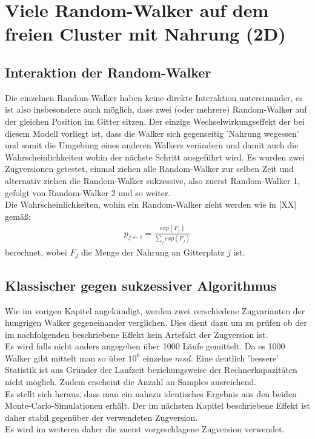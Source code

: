 \documentclass[a4paper, 12pt]{scrartcl}
\author{Sebastian Steinhäuser}
\begin{document}
\tableofcontents
\newpage
\section{Viele Random-Walker auf dem freien Cluster mit Nahrung (2D)}
\subsection{Interaktion der Random-Walker}
Die einzelnen Random-Walker haben keine direkte Interaktion untereinander, es ist also insbesondere auch möglich, dass zwei (oder mehrere) Random-Walker auf der gleichen Position im Gitter sitzen. Der einzige Wechselwirkungseffekt der bei diesem Modell vorliegt ist, dass die Walker sich gegenseitig 'Nahrung wegessen' und somit die Umgebung eines anderen Walkers verändern und damit auch die Wahrscheinlichkeiten wohin der nächste Schritt ausgeführt wird. Es wurden zwei Zugversionen getestet, einmal ziehen alle Random-Walker zur selben Zeit und alternativ ziehen die Random-Walker sukzessive, also zuerst Random-Walker 1, gefolgt von Random-Walker 2 und so weiter. \\
\noindent Die Wahrscheinlichkeiten, wohin ein Random-Walker zieht werden wie in [XX] gemäß:
\begin{align}
p_{j \leftarrow i} = \frac{exp({F_j})}{\sum_j exp({F_j})}
\label{Wkeiten}
\end{align}
berechnet, wobei $F_j$ die Menge der Nahrung an Gitterplatz $j$ ist.

\subsection{Klassischer gegen sukzessiver Algorithmus}
Wie im vorigen Kapitel angekündigt, werden zwei verschiedene Zugvarianten der hungrigen Walker gegeneinander verglichen. Dies dient dazu um zu prüfen ob der im nachfolgenden beschriebene Effekt kein Artefakt der Zugversion ist.
\\
\noindent Es wird falls nicht anders angegeben über 1000 Läufe gemittelt. Da es 1000 Walker gibt mittelt man so über $10^6$ einzelne $msd$. Eine deutlich 'bessere' Statistik ist aus Gründer der Laufzeit beziehungsweise der Rechnerkapazitäten nicht möglich. Zudem erscheint die Anzahl an Samples ausreichend.
\\
\noindent Es stellt sich heraus, dass man ein nahezu identisches Ergebnis aus den beiden Monte-Carlo-Simulationen erhält. Der im nächsten Kapitel beschriebene Effekt ist daher stabil gegenüber der verwendeten Zugversion.
\\
\noindent Es wird im weiteren daher die zuerst vorgeschlagene Zugversion verwendet.
\end{document}
